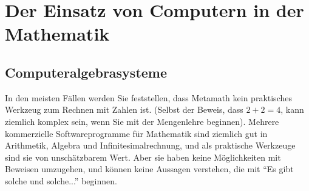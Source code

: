 \section{Der Einsatz von Computern in der Mathe\-matik}

\subsection{Computeralgebrasysteme}

In den meisten Fällen werden Sie feststellen, dass Metamath kein praktisches Werkzeug zum Rechnen mit Zahlen ist.  (Selbst der Beweis, dass $2 + 2 = 4$, kann ziemlich komplex sein, wenn Sie mit der Mengenlehre beginnen).  Mehrere kommerzielle Softwareprogramme für Mathematik sind ziemlich gut in Arithmetik, Algebra und Infinitesimalrechnung, und als praktische Werkzeuge sind sie von unschätzbarem Wert. Aber sie haben keine Möglichkeiten mit Beweisen umzugehen, und können keine Aussagen verstehen, die mit "`Es gibt solche und solche..."' beginnen.

